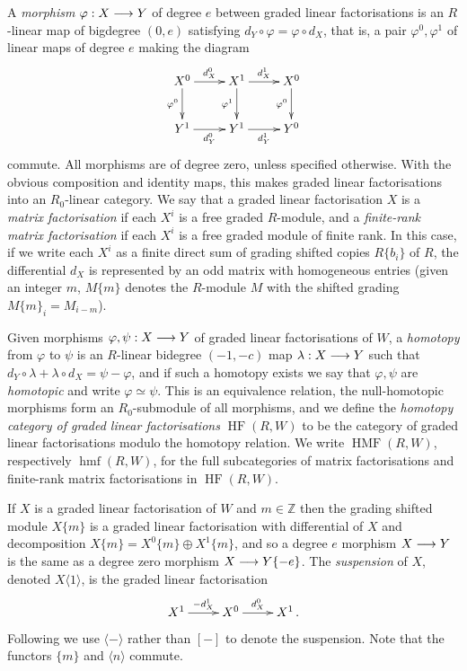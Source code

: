 \documentclass{compositio}
\theoremstyle{definition}
\numberwithin{equation}{section}
\DeclareMathOperator{\hmf}{hmf}
\DeclareMathOperator{\HMF}{HMF}
\DeclareMathOperator{\HF}{HF}
\begin{document}
A \emph{morphism} $\varphi: X \longrightarrow Y$ of degree $e$ between graded linear factorisations is an $R$-linear map of bigdegree $(0, e)$ satisfying $d_Y \circ \varphi = \varphi \circ d_X$, that is, a pair $\varphi^0, \varphi^1$ of linear maps of degree $e$ making the diagram
\[
\xymatrix{
X^0 \ar[d]_-{\varphi^0} \ar[r]^-{d_X^0} & X^1 \ar[d]_-{\varphi^1} \ar[r]^-{d_X^1} & X^0 \ar[d]_-{\varphi^0}\\
Y^1 \ar[r]_-{d_Y^0} & Y^1 \ar[r]_-{d_Y^1} & Y^0
}
\] 
commute. All morphisms are of degree zero, unless specified otherwise. With the obvious composition and identity maps, this makes graded linear factorisations into an $R_0$-linear category. We say that a graded linear factorisation $X$ is a \emph{matrix factorisation} if each $X^i$ is a free graded $R$-module, and a \emph{finite-rank matrix factorisation} if each $X^i$ is a free graded module of finite rank. In this case, if we write each $X^i$ as a finite direct sum of grading shifted copies $R\{ b_i \}$ of $R$, the differential $d_X$ is represented by an odd matrix with homogeneous entries (given an integer $m$, $M\{ m \}$ denotes the $R$-module $M$ with the shifted grading $M\{ m \}_i = M_{i - m}$).

Given morphisms $\varphi, \psi: X \longrightarrow Y$ of graded linear factorisations of $W$, a \emph{homotopy} from $\varphi$ to $\psi$ is an $R$-linear bidegree $(-1,-c)$ map $\lambda: X \longrightarrow Y$ such that $d_Y \circ \lambda + \lambda \circ d_X = \psi - \varphi$, and if such a homotopy exists we say that $\varphi, \psi$ are \emph{homotopic} and write $\varphi \simeq \psi$. This is an equivalence relation, the null-homotopic morphisms form an $R_0$-submodule of all morphisms, and we define the \emph{homotopy category of graded linear factorisations} $\HF(R,W)$ to be the category of graded linear factorisations modulo the homotopy relation. We write $\HMF(R,W)$, respectively $\hmf(R,W)$, for the full subcategories of matrix factorisations and finite-rank matrix factorisations in $\HF(R,W)$. 

If $X$ is a graded linear factorisation of $W$ and $m \in \mathds{Z}$ then the grading shifted module $X\{ m \}$ is a graded linear factorisation with differential of $X$ and decomposition $X\{ m \} = X^0\{ m \} \oplus X^1\{ m \}$, and so a degree $e$ morphism $X \longrightarrow Y$ is the same as a degree zero morphism $X \longrightarrow Y\{-e\}$. The \emph{suspension} of $X$, denoted $X\langle 1 \rangle$, is the graded linear factorisation
\[
\xymatrix{
X^1 \ar[r]^-{-d_X^1} & X^0 \ar[r]^-{d_X^0} & X^1\,.
}
\]
Following \cite{kr0401268} we use $\langle - \rangle$ rather than $[-]$ to denote the suspension. Note that the functors $\{ m \}$ and $\langle n \rangle$ commute.
\end{document}

